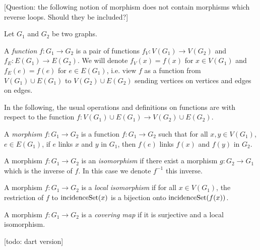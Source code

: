 [Question: the following notion of morphism does not contain morphisms which
reverse loops. Should they be included?]

Let $G_1$ and $G_2$ be two graphs.


\begin{definition}
  \label{def:function_graphs}
  A \emph{function} $f : G_1 \rightarrow G_2$ is a pair of functions $f_V : V(G_1) \rightarrow V(G_2)$
  and $f_E : E(G_1) \rightarrow E(G_2)$.
  We will denote $f_V(x)=f(x)$ for $x \in V(G_1)$ and $f_E(e)=f(e)$ for $e \in E(G_1)$,
  i.e. view $f$ as a function from $V(G_1) \cup E(G_1)$ to $V(G_2) \cup E(G_2)$
  sending vertices on vertices and edges on edges.
\end{definition}

In the following, the usual operations and definitions on functions are
with respect to the function $f : V(G_1) \cup E(G_1) \rightarrow V(G_2) \cup E(G_2)$.

\begin{definition}
  \label{def:graph_morphism}
  A \emph{morphism} $f : G_1 \rightarrow G_2$ is
  a function $f : G_1 \rightarrow G_2$ such that for all
  $x, y \in V(G_1)$, $e \in E(G_1)$,
  if $e$ links $x$ and $y$ in $G_1$, then $f(e)$ links $f(x)$ and $f(y)$ in $G_2$.
\end{definition}

\begin{definition}
  \label{def:graph_isomorphism}
  A morphism $f : G_1 \rightarrow G_2$ is an \emph{isomorphism} if
  there exist a morphism $g : G_2 \rightarrow G_1$ which is the inverse of $f$.
  In this case we denote $f^{-1}$ this inverse.
\end{definition}

\begin{definition}
  \label{def:local_isomorphism}
  A morphism $f : G_1 \rightarrow G_2$ is a \emph{local isomorphism}
  if for all $x \in V(G_1)$, the restriction of $f$ to $\mathrm{incidenceSet}(x)$ is
  a bijection onto $\mathrm{incidenceSet}(f(x))$.
\end{definition}

\begin{definition}
  \label{def:covering_map}
  A morphism $f : G_1 \rightarrow G_2$ is a \emph{covering map} if it is
  surjective and a local isomorphism.
\end{definition}

[todo: dart version]

